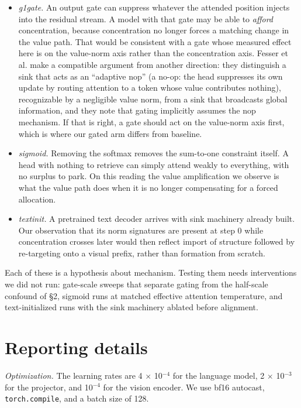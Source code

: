\documentclass{article}
\begin{document}
\begin{itemize}
  \item \textit{g1gate.} An output gate can suppress whatever the attended position injects into the residual stream. A model with that gate may be able to \textit{afford} concentration, because concentration no longer forces a matching change in the value path. That would be consistent with a gate whose measured effect here is on the value-norm axis rather than the concentration axis. Fesser et al. \cite{ref23} make a compatible argument from another direction: they distinguish a sink that acts as an ``adaptive nop'' (a no-op: the head suppresses its own update by routing attention to a token whose value contributes nothing), recognizable by a negligible value norm, from a sink that broadcasts global information, and they note that gating implicitly assumes the nop mechanism. If that is right, a gate should act on the value-norm axis first, which is where our gated arm differs from baseline.
  \item \textit{sigmoid.} Removing the softmax removes the sum-to-one constraint itself. A head with nothing to retrieve can simply attend weakly to everything, with no surplus to park. On this reading the value amplification we observe is what the value path does when it is no longer compensating for a forced allocation.
  \item \textit{textinit.} A pretrained text decoder arrives with sink machinery already built. Our observation that its norm signatures are present at step 0 while concentration crosses later would then reflect import of structure followed by re-targeting onto a visual prefix, rather than formation from scratch.
\end{itemize}

Each of these is a hypothesis about mechanism. Testing them needs interventions we did not run: gate-scale sweeps that separate gating from the half-scale confound of \S2, sigmoid runs at matched effective attention temperature, and text-initialized runs with the sink machinery ablated before alignment.

\section{Reporting details}

\textit{Optimization.} The learning rates are 4 $\times$ 10$^{-4}$ for the language model, 2 $\times$ 10$^{-3}$ for the projector, and 10$^{-4}$ for the vision encoder. We use bf16 autocast, \texttt{torch.compile}, and a batch size of 128.
\end{document}
